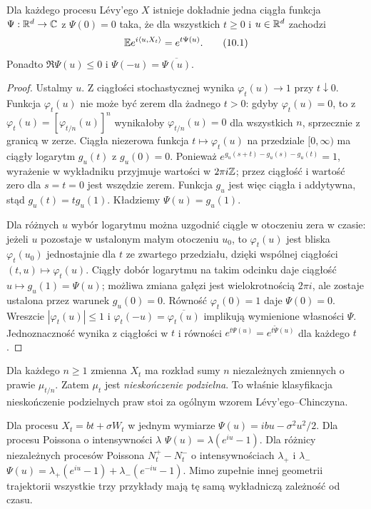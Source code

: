 \begin{twierdzenie}
\label{th:levy-exponent}
Dla każdego procesu Lévy'ego $X$ istnieje dokładnie jedna
ciągła funkcja $\Psi:\mathbb{R}^d\to\mathbb C$ z $\Psi(0)=0$
taka, że dla wszystkich $t\ge0$ i $u\in\mathbb{R}^d$ zachodzi
\[
\mathbb{E} e^{i\langle u,X_t\rangle}=e^{t\Psi(u)}.
\tag{10.1}\label{eq:levy-exponent}
\]
Ponadto $\Re\Psi(u)\le0$ i $\Psi(-u)=\overline{\Psi(u)}$.
\end{twierdzenie}
\begin{proof}
Ustalmy $u$. Z ciągłości stochastycznej wynika
$\varphi_t(u)\to1$ przy $t\downarrow0$.
Funkcja $\varphi_t(u)$ nie może być zerem dla żadnego $t>0$:
gdyby $\varphi_t(u)=0$, to z
$\varphi_t(u)=[\varphi_{t/n}(u)]^n$ wynikałoby
$\varphi_{t/n}(u)=0$ dla wszystkich $n$, sprzecznie z
granicą w zerze. Ciągła niezerowa funkcja
$t\mapsto\varphi_t(u)$ na przedziale $[0,\infty)$
ma ciągły logarytm $g_u(t)$ z $g_u(0)=0$.
Ponieważ $e^{g_u(s+t)-g_u(s)-g_u(t)}=1$,
wyrażenie w wykładniku przyjmuje wartości w $2\pi i\mathbb{Z}$;
przez ciągłość i wartość zero dla $s=t=0$ jest wszędzie zerem.
Funkcja $g_u$ jest więc ciągła i addytywna, stąd
$g_u(t)=t g_u(1)$. Kładziemy $\Psi(u)=g_u(1)$.

Dla różnych $u$ wybór logarytmu można uzgodnić ciągle
w otoczeniu zera w czasie: jeżeli $u$ pozostaje w ustalonym
małym otoczeniu $u_0$, to $\varphi_t(u)$ jest bliska
$\varphi_t(u_0)$ jednostajnie dla $t$ ze zwartego przedziału,
dzięki wspólnej ciągłości $(t,u)\mapsto\varphi_t(u)$.
Ciągły dobór logarytmu na takim odcinku daje ciągłość
$u\mapsto g_u(1)=\Psi(u)$; możliwa zmiana gałęzi jest
wielokrotnością $2\pi i$, ale zostaje ustalona przez
warunek $g_u(0)=0$. Równość $\varphi_t(0)=1$ daje
$\Psi(0)=0$. Wreszcie $|\varphi_t(u)|\le1$ i
$\varphi_t(-u)=\overline{\varphi_t(u)}$ implikują
wymienione własności $\Psi$.
Jednoznaczność wynika z ciągłości w $t$ i równości
$e^{t\Psi(u)}=e^{t\widetilde\Psi(u)}$ dla każdego $t$.
\end{proof}

\begin{uwaga}
Dla każdego $n\ge1$ zmienna $X_t$ ma rozkład sumy $n$
niezależnych zmiennych o prawie $\mu_{t/n}$.
Zatem $\mu_t$ jest \emph{nieskończenie podzielna}.
To właśnie klasyfikacja nieskończenie podzielnych praw
stoi za ogólnym wzorem Lévy'ego--Chinczyna.
\end{uwaga}

\begin{przyklad}
Dla procesu $X_t=bt+\sigma W_t$ w jednym wymiarze
$\Psi(u)=ibu-\sigma^2u^2/2$.
Dla procesu Poissona o intensywności $\lambda$
$\Psi(u)=\lambda(e^{iu}-1)$.
Dla różnicy niezależnych procesów Poissona
$N_t^+-N_t^-$ o intensywnościach $\lambda_+$ i $\lambda_-$
$\Psi(u)=\lambda_+(e^{iu}-1)+\lambda_-(e^{-iu}-1)$.
Mimo zupełnie innej geometrii trajektorii wszystkie trzy
przykłady mają tę samą wykładniczą zależność od czasu.
\end{przyklad}


